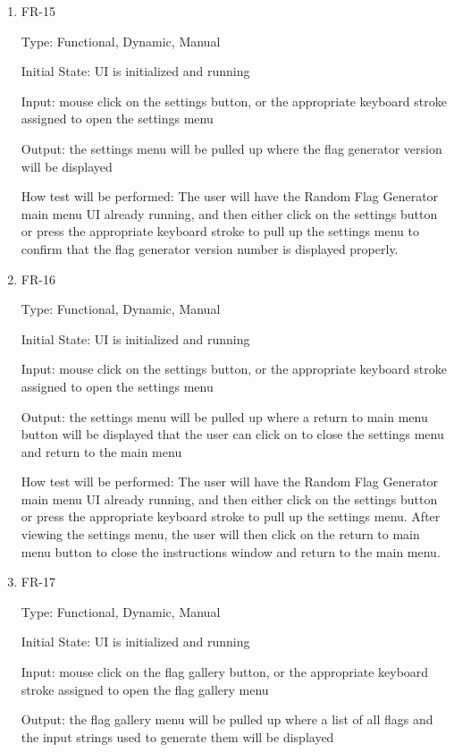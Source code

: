 \documentclass[12pt, titlepage]{article}
\begin{document}
\begin{enumerate}
\item{FR-15\\}

Type: Functional, Dynamic, Manual

Initial State: UI is initialized and running

Input: mouse click on the settings button, or the appropriate keyboard stroke
assigned to open the settings menu

Output: the settings menu will be pulled up where the flag generator version
will be displayed

How test will be performed: The user will have the Random Flag Generator main
menu UI already running, and then either click on the settings button or press
the appropriate keyboard stroke to pull up the settings menu to confirm that
the flag generator version number is displayed properly.

\item{FR-16\\}

Type: Functional, Dynamic, Manual

Initial State: UI is initialized and running

Input: mouse click on the settings button, or the appropriate keyboard stroke
assigned to open the settings menu

Output: the settings menu will be pulled up where a return to main menu button
will be displayed that the user can click on to close the settings menu and
return to the main menu

How test will be performed: The user will have the Random Flag Generator main
menu UI already running, and then either click on the settings button or press
the appropriate keyboard stroke to pull up the settings menu. After viewing
the settings menu, the user will then click on the return to main menu button
to close the instructions window and return to the main menu.

\item{FR-17\\}

Type: Functional, Dynamic, Manual

Initial State: UI is initialized and running

Input: mouse click on the flag gallery button, or the appropriate keyboard
stroke assigned to open the flag gallery menu

Output: the flag gallery menu will be pulled up where a list of all flags and
the input strings used to generate them will be displayed


\end{enumerate}
\end{document}
